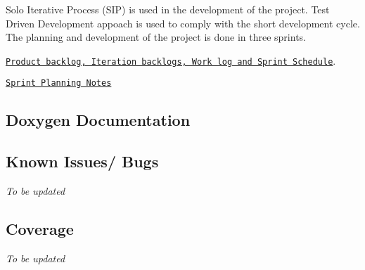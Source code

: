 Solo Iterative Process (S\+IP) is used in the development of the project. Test Driven Development appoach is used to comply with the short development cycle. The planning and development of the project is done in three sprints.

\href{https://docs.google.com/spreadsheets/d/1y6k_Kw1-uYTfiacjPWWJsFmW3S48nC0fhaB75R_D93A/edit?usp=sharing}{\tt Product backlog, Iteration backlogs, Work log and Sprint Schedule}.

\href{https://docs.google.com/document/d/1q5BGRm5D0xjOvHy-o9cROjHJibJuXT3Z7A8dWZFaC8w/edit?usp=sharing}{\tt Sprint Planning Notes}

\subsection*{Doxygen Documentation}

\subsection*{Known Issues/ Bugs}

{\itshape To be updated}

\subsection*{Coverage}

{\itshape To be updated} 